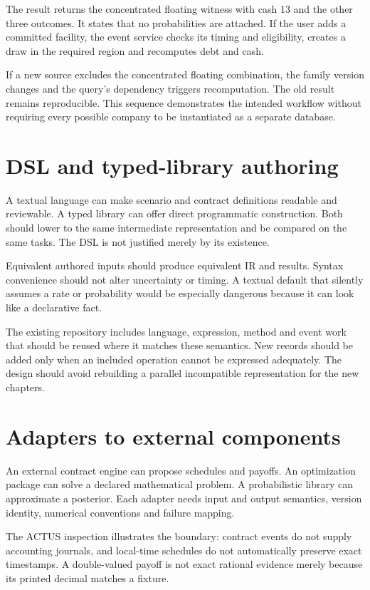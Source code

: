The result returns the concentrated floating witness with cash 13 and the other three outcomes. It states that no probabilities are attached. If the user adds a committed facility, the event service checks its timing and eligibility, creates a draw in the required region and recomputes debt and cash.

If a new source excludes the concentrated floating combination, the family version changes and the query's dependency triggers recomputation. The old result remains reproducible. This sequence demonstrates the intended workflow without requiring every possible company to be instantiated as a separate database.

\section{DSL and typed-library authoring}
A textual language can make scenario and contract definitions readable and reviewable. A typed library can offer direct programmatic construction. Both should lower to the same intermediate representation and be compared on the same tasks. The DSL is not justified merely by its existence.

Equivalent authored inputs should produce equivalent IR and results. Syntax convenience should not alter uncertainty or timing. A textual default that silently assumes a rate or probability would be especially dangerous because it can look like a declarative fact.

The existing repository includes language, expression, method and event work that should be reused where it matches these semantics. New records should be added only when an included operation cannot be expressed adequately. The design should avoid rebuilding a parallel incompatible representation for the new chapters.

\section{Adapters to external components}
An external contract engine can propose schedules and payoffs. An optimization package can solve a declared mathematical problem. A probabilistic library can approximate a posterior. Each adapter needs input and output semantics, version identity, numerical conventions and failure mapping.

The ACTUS inspection illustrates the boundary: contract events do not supply accounting journals, and local-time schedules do not automatically preserve exact timestamps. A double-valued payoff is not exact rational evidence merely because its printed decimal matches a fixture.

